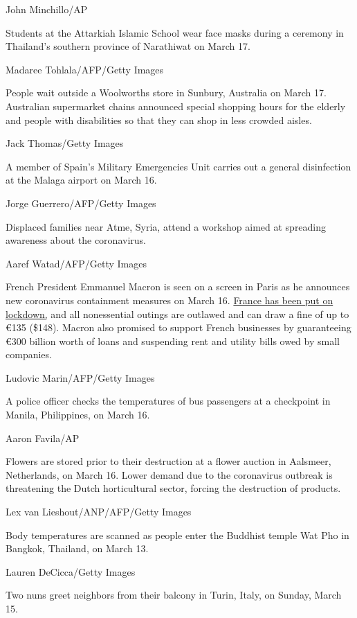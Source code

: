 John Minchillo/AP

Students at the Attarkiah Islamic School wear face masks during a
ceremony in Thailand's southern province of Narathiwat on March 17.

Madaree Tohlala/AFP/Getty Images

People wait outside a Woolworths store in Sunbury, Australia on March
17. Australian supermarket chains announced special shopping hours for
the elderly and people with disabilities so that they can shop in less
crowded aisles.

Jack Thomas/Getty Images

A member of Spain's Military Emergencies Unit carries out a general
disinfection at the Malaga airport on March 16.

Jorge Guerrero/AFP/Getty Images

Displaced families near Atme, Syria, attend a workshop aimed at
spreading awareness about the coronavirus.

Aaref Watad/AFP/Getty Images

French President Emmanuel Macron is seen on a screen in Paris as he
announces new coronavirus containment measures on March 16.
\href{https://www.cnn.com/world/live-news/coronavirus-outbreak-03-17-20-intl-hnk/h_da63d65d14fcffbc7105f1a287478a55}{France
has been put on lockdown,} and all nonessential outings are outlawed and
can draw a fine of up to €135 (\$148). Macron also promised to support
French businesses by guaranteeing €300 billion worth of loans and
suspending rent and utility bills owed by small companies.

Ludovic Marin/AFP/Getty Images

A police officer checks the temperatures of bus passengers at a
checkpoint in Manila, Philippines, on March 16.

Aaron Favila/AP

Flowers are stored prior to their destruction at a flower auction in
Aalsmeer, Netherlands, on March 16. Lower demand due to the coronavirus
outbreak is threatening the Dutch horticultural sector, forcing the
destruction of products.

Lex van Lieshout/ANP/AFP/Getty Images

Body temperatures are scanned as people enter the Buddhist temple Wat
Pho in Bangkok, Thailand, on March 13.

Lauren DeCicca/Getty Images

Two nuns greet neighbors from their balcony in Turin, Italy, on Sunday,
March 15.

